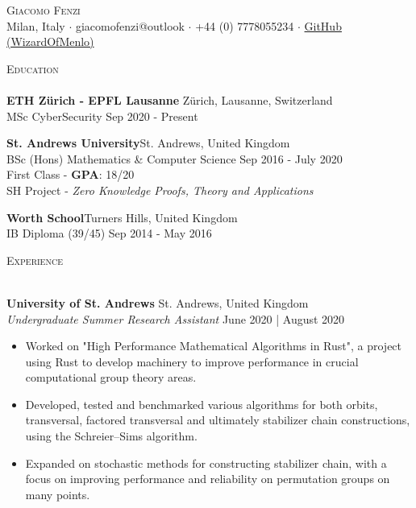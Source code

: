\documentclass[a4paper]{article}
\newcommand{\lineunder} {
    \vspace*{-8pt} \\
    \hspace*{-18pt} \hrulefill \\
}
\newcommand{\header} [1] {
    {\hspace*{-18pt}\vspace*{6pt} \textsc{#1}}
    \vspace*{-6pt} \lineunder
}
\begin{document}
\vspace*{-40pt}



\vspace*{-10pt}
\begin{center}
    {\Huge \scshape {Giacomo Fenzi}}\\
    Milan, Italy $\cdot$ giacomofenzi@outlook $\cdot$ +44 (0) 7778055234 $\cdot$ \href{https://github.com/WizardOfMenlo/}{GitHub (WizardOfMenlo)}\\
\end{center}

\header{Education}
\textbf{ETH Zürich - EPFL Lausanne} \hfill Zürich, Lausanne, Switzerland \\
MSc CyberSecurity \hfill Sep 2020 - Present \\
\vspace{2mm}

\textbf{St. Andrews University}\hfill St. Andrews, United Kingdom\\
BSc (Hons) Mathematics \& Computer Science \hfill Sep 2016 - July 2020\\
First Class - \textbf{GPA}: 18/20 \\
SH Project - 
\textit{Zero Knowledge Proofs, Theory and Applications} \\
\vspace{2mm}

\textbf{Worth School}\hfill Turners Hills, United Kingdom\\
IB Diploma (39/45) \hfill Sep 2014 - May 2016 \\

\vspace{2mm}

\header{Experience}
\vspace{1mm}

\textbf{University of St. Andrews} \hfill St. Andrews, United Kingdom \\
\textit{Undergraduate Summer Research Assistant} \hfill{June 2020 | August 2020}
\vspace{-1mm}
\begin{itemize}
    \item Worked on "High Performance Mathematical Algorithms in Rust", a project
          using Rust to develop machinery to improve performance in crucial computational group theory areas.
    \item Developed, tested and benchmarked various algorithms for both orbits, transversal,
          factored transversal and ultimately stabilizer chain constructions, using the Schreier–Sims algorithm.
    \item Expanded on stochastic methods for constructing stabilizer chain, with a focus on improving performance and reliability 
          on permutation groups on many points. 
\end{itemize}
\end{document}

